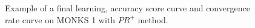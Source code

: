 \begin{appendices}
\begin{figure}[H]
\begin{subfigure}{0.40\textwidth}
                    \label{fig:monks_1_ACC_CGD}
                \end{subfigure}
                \begin{subfigure}{0.40\textwidth}
                    \caption{}
                    \label{fig:monks_1_NORM_CGD}
                \end{subfigure}
                \caption{Example of a final learning, accuracy score curve and
                convergence rate curve on MONKS 1 with $PR^+$ method.}
                \label{fig:monks_1_CGD}
            \end{figure}


\end{appendices}

